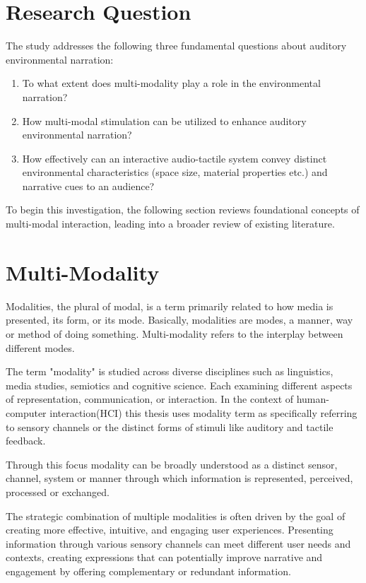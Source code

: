     \section{Research Question} 
    The study addresses the following three fundamental questions about auditory environmental narration:
    \begin{enumerate}
        \item To what extent does multi-modality play a role in the environmental narration?
        \item How multi-modal stimulation can be utilized to enhance auditory environmental narration?
        \item How effectively can an interactive audio-tactile system convey distinct environmental characteristics (space size, material properties etc.) and narrative cues to an audience?
    \end{enumerate}
    To begin this investigation, the following section reviews foundational concepts of multi-modal interaction, leading into a broader review of existing literature.
    \section{Multi-Modality} 
    Modalities, the plural of modal, is a term primarily related to how media is presented, its form, or its mode. Basically, modalities are modes, a manner, way or method of doing something. Multi-modality refers to the interplay between different modes\cite{Multimodal_Discourse}.\par 

    The term "modality" is studied across diverse disciplines such as linguistics, media studies, semiotics and cognitive science. Each examining different aspects of representation, communication, or interaction. In the context of human-computer interaction(HCI) this thesis uses modality term as specifically referring to sensory channels or the distinct forms of stimuli like auditory and tactile feedback.\par

    Through this focus modality can be broadly understood as a distinct sensor, channel, system or manner through which information is represented, perceived, processed or exchanged.\par

    The strategic combination of multiple modalities is often driven by the goal of creating more effective, intuitive, and engaging user experiences. Presenting information through various sensory channels can meet different user needs and contexts, creating expressions that can potentially improve narrative and engagement by offering complementary or redundant information.\par

